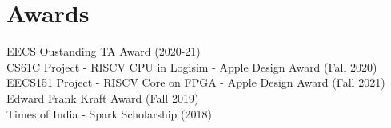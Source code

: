 \documentclass[]{deedy-resume-openfont}
\begin{document}
\begin{minipage}[t]{0.33\textwidth}
\section{Awards}

EECS Oustanding TA Award (2020-21) \\
CS61C Project - RISCV CPU in Logisim - Apple Design Award (Fall 2020) \\
EECS151 Project - RISCV Core on FPGA - Apple Design Award (Fall 2021) \\
Edward Frank Kraft Award (Fall 2019) \\
Times of India - Spark Scholarship (2018)


%
%

\end{minipage} 
\hfill
\end{document}
